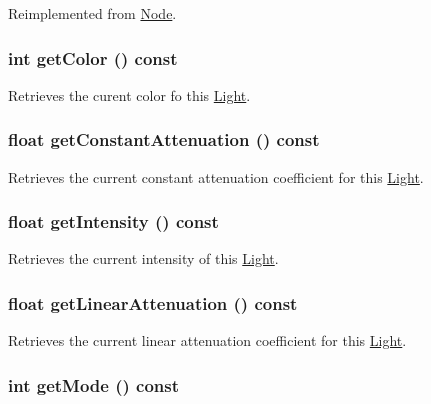 Reimplemented from \hyperlink{classm3g_1_1Node_8aad1ceab4c2a03609c8a42324ce484d}{Node}.\hypertarget{classm3g_1_1Light_4cfa1931c265ec3412fe3f6408a1b4f5}{
\subsubsection[{getColor}]{\setlength{\rightskip}{0pt plus 5cm}int getColor () const}}
\label{classm3g_1_1Light_4cfa1931c265ec3412fe3f6408a1b4f5}


Retrieves the curent color fo this \hyperlink{classm3g_1_1Light}{Light}. \hypertarget{classm3g_1_1Light_9553ab96cb7639acafcebb81888af687}{
\subsubsection[{getConstantAttenuation}]{\setlength{\rightskip}{0pt plus 5cm}float getConstantAttenuation () const}}
\label{classm3g_1_1Light_9553ab96cb7639acafcebb81888af687}


Retrieves the current constant attenuation coefficient for this \hyperlink{classm3g_1_1Light}{Light}. \hypertarget{classm3g_1_1Light_ca846da41d09a6ae01d6b362c33e938d}{
\subsubsection[{getIntensity}]{\setlength{\rightskip}{0pt plus 5cm}float getIntensity () const}}
\label{classm3g_1_1Light_ca846da41d09a6ae01d6b362c33e938d}


Retrieves the current intensity of this \hyperlink{classm3g_1_1Light}{Light}. \hypertarget{classm3g_1_1Light_50e949b0cc2014e576987379cac07769}{
\subsubsection[{getLinearAttenuation}]{\setlength{\rightskip}{0pt plus 5cm}float getLinearAttenuation () const}}
\label{classm3g_1_1Light_50e949b0cc2014e576987379cac07769}


Retrieves the current linear attenuation coefficient for this \hyperlink{classm3g_1_1Light}{Light}. \hypertarget{classm3g_1_1Light_d4ce4524e4751fe5e3cfb8c270347d54}{
\subsubsection[{getMode}]{\setlength{\rightskip}{0pt plus 5cm}int getMode () const}}
\label{classm3g_1_1Light_d4ce4524e4751fe5e3cfb8c270347d54}


